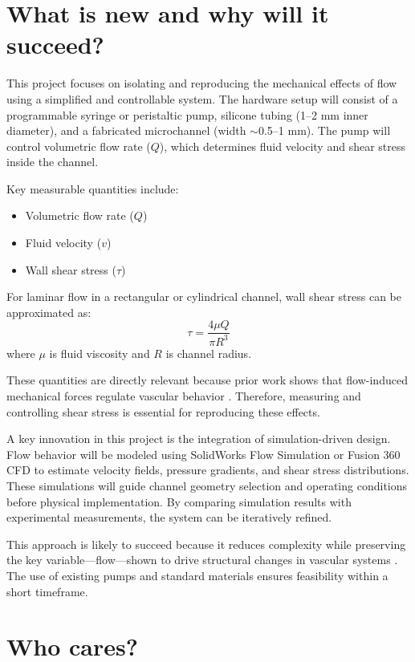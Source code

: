 \documentclass[conference]{IEEEtran}
\begin{document}
\section{What is new and why will it succeed?}

This project focuses on isolating and reproducing the mechanical effects of flow using a simplified and controllable system. The hardware setup will consist of a programmable syringe or peristaltic pump, silicone tubing (1–2 mm inner diameter), and a fabricated microchannel (width $\sim$0.5–1 mm). The pump will control volumetric flow rate ($Q$), which determines fluid velocity and shear stress inside the channel.

Key measurable quantities include:
\begin{itemize}
\item Volumetric flow rate ($Q$)
\item Fluid velocity ($v$)
\item Wall shear stress ($\tau$)
\end{itemize}

For laminar flow in a rectangular or cylindrical channel, wall shear stress can be approximated as:
\begin{equation}
\tau = \frac{4 \mu Q}{\pi R^3}
\end{equation}
where $\mu$ is fluid viscosity and $R$ is channel radius.

These quantities are directly relevant because prior work shows that flow-induced mechanical forces regulate vascular behavior \cite{yap2026}. Therefore, measuring and controlling shear stress is essential for reproducing these effects.

A key innovation in this project is the integration of simulation-driven design. Flow behavior will be modeled using SolidWorks Flow Simulation or Fusion 360 CFD to estimate velocity fields, pressure gradients, and shear stress distributions. These simulations will guide channel geometry selection and operating conditions before physical implementation. By comparing simulation results with experimental measurements, the system can be iteratively refined.

This approach is likely to succeed because it reduces complexity while preserving the key variable—flow—shown to drive structural changes in vascular systems \cite{yap2026}. The use of existing pumps and standard materials ensures feasibility within a short timeframe.

\section{Who cares?}
\end{document}
